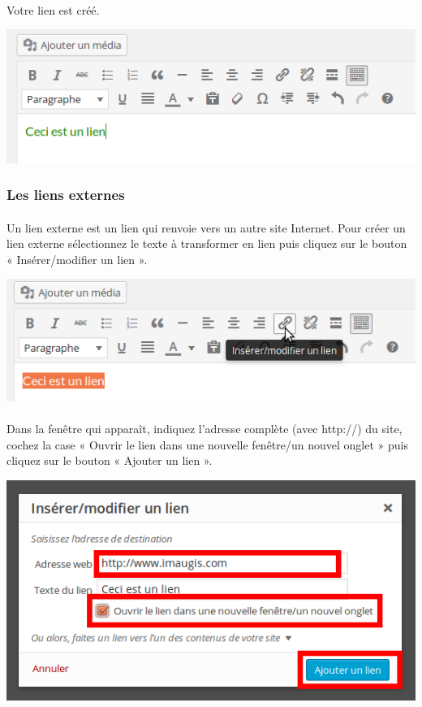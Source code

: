 \documentclass[10pt,a4paper]{article}
\begin{document}
\paragraph{}Votre lien est créé.
\begin{center}
\includegraphics[scale=0.35]{img/0079.png}
\end{center}
\subsubsection{Les liens externes}
\paragraph{}Un lien externe est un lien qui renvoie vers un autre site Internet. Pour créer un lien externe sélectionnez le texte à transformer en lien puis cliquez sur le bouton « Insérer/modifier un lien ».
\begin{center}
\includegraphics[scale=0.35]{img/0077.png}
\end{center}
\paragraph{}Dans la fenêtre qui apparaît, indiquez l'adresse complète (avec http://) du site, cochez la case « Ouvrir le lien dans une nouvelle fenêtre/un nouvel onglet » puis cliquez sur le bouton « Ajouter un lien ».
\begin{center}
\includegraphics[scale=0.35]{img/0080.png}
\end{center}
\end{document}

